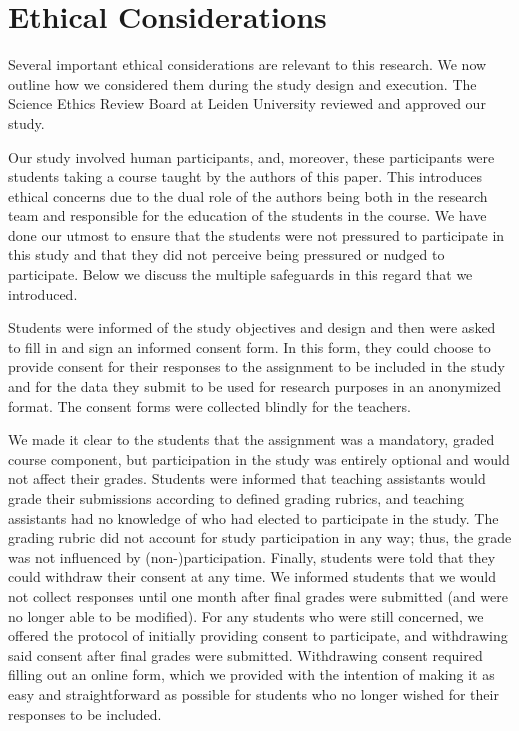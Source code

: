 
\section{Ethical Considerations}
\label{sec:ethics}

Several important ethical considerations are relevant to this research. We now outline how we considered them during the study design and execution. The Science Ethics Review Board at Leiden University reviewed and approved our study. 

Our study involved human participants, and, moreover, these participants were students taking a course taught by the authors of this paper. This introduces ethical concerns due to the dual role of the authors being both in the research team and responsible for the education of the students in the course. We have done our utmost to ensure that the students were not pressured to participate in this study and that they did not perceive being pressured or nudged to participate. Below we discuss the multiple safeguards in this regard that we introduced. 

Students were informed of the study objectives and design and then were asked to fill in and sign an informed consent form. In this form, they could choose to provide consent for their responses to the assignment to be included in the study and for the data they submit to be used for research purposes in an anonymized format. The consent forms were collected blindly for the teachers. 

We made it clear to the students that the assignment was a mandatory, graded course component, but participation in the study was entirely optional and would not affect their grades. Students were informed that teaching assistants would grade their submissions according to defined grading rubrics, and teaching assistants had no knowledge of who had elected to participate in the study. The grading rubric did not account for study participation in any way; thus, the grade was not influenced by (non-)participation. Finally, students were told that they could withdraw their consent at any time. We informed students that we would not collect responses until one month after final grades were submitted (and were no longer able to be modified). For any students who were still concerned, we offered the protocol of initially providing consent to participate, and withdrawing said consent after final grades were submitted. Withdrawing consent required filling out an online form, which we provided with the intention of making it as easy and straightforward as possible for students who no longer wished for their responses to be included.

